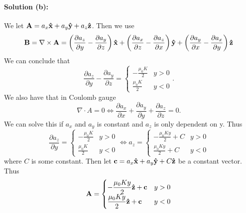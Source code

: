 \paragraph{Solution (b):} We let $\bm{\mathrm{A}} = a_x \bm{\mathrm{\hat{x}}} + a_y \bm{\mathrm{\hat{y}}} + a_z \bm{\mathrm{\hat{z}}}$. Then we use
\begin{equation}
    \bm{\mathrm{B}} = \nabla \times \bm{\mathrm{A}} = 
     \left( \frac{\partial a_z}{\partial y} - \frac{\partial a_y}{\partial z} \right)\bm{\mathrm{\hat{x}}} 
    +\left( \frac{\partial a_x}{\partial z} - \frac{\partial a_z}{\partial x} \right)\bm{\mathrm{\hat{y}}} 
    +\left( \frac{\partial a_y}{\partial x} - \frac{\partial a_x}{\partial y} \right)\bm{\mathrm{\hat{z}}} 
\end{equation}
We can conclude that 
\begin{equation}
    \frac{\partial a_z}{\partial y} - \frac{\partial a_y}{\partial z} = \begin{cases}\displaystyle
        -\frac{\mu_0 K}{2} & y > 0\\ \displaystyle
        \frac{\mu_0 K}{2} & y < 0
    \end{cases}.
\end{equation}
We also have that in Coulomb gauge
\begin{equation}
    \nabla \cdot A = 0 \iff \frac{\partial a_x}{\partial x} +\frac{\partial a_y}{\partial y} +\frac{\partial a_z}{\partial z} = 0.
\end{equation}
We can solve this if $a_x$ and $a_y$ is constant and $a_z$ is only dependent on y. Thus 
\begin{equation}
    \frac{\partial a_z}{\partial y} = \begin{cases}\displaystyle
        -\frac{\mu_0 K}{2} & y > 0\\ \displaystyle
        \frac{\mu_0 K}{2} & y < 0
    \end{cases}
        \iff 
        a_z = \begin{cases}\displaystyle
            -\frac{\mu_0 K y}{2} + C & y > 0\\ \displaystyle
            \frac{\mu_0 K y}{2} + C & y < 0
        \end{cases}
\end{equation}
where $C$ is some constant. Then let $\bm{\mathrm{c}} = a_x \bm{\mathrm{\hat{x}}} + a_y \bm{\mathrm{\hat{y}}} + C \bm{\mathrm{\hat{z}}}$ be a constant vector. Thus 
\begin{equation}
    \bm{\mathrm{A}} = \begin{cases} \displaystyle
        -\frac{\mu_0 K y}{2}\bm{\mathrm{\hat{z}}} + \bm{\mathrm{c}} & y > 0\\ \displaystyle
        \frac{\mu_0 K y}{2}\bm{\mathrm{\hat{z}}} + \bm{\mathrm{c}} & y < 0
    \end{cases}
\end{equation}
